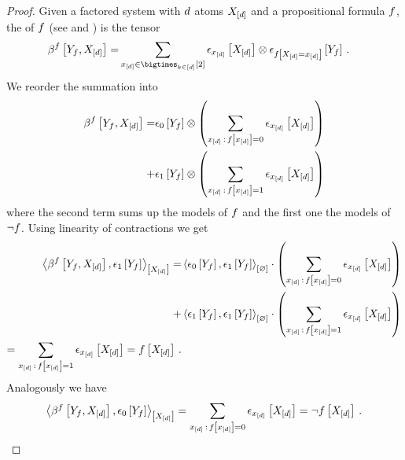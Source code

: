 \begin{proof}
    Given a factored system with $d$ atoms $X_{[d]}$ and a propositional formula $f$, the \basisEncoding{} of $f$ (see  and ) is the tensor
    \begin{align*}
        \bencodingofat{\formula}{\formulavar,\shortcatvariables}
        = & \sum_{\shortcatindices\in\atomstates}  \onehotmapofat{\shortcatindices}{\shortcatvariables} \otimes \onehotmapofat{\formulaat{\indexedshortcatvariables}}{\formulavar} \, .
    \end{align*}
    We reorder the summation into
    \begin{align*}
        \bencodingofat{\formula}{\formulavar,\shortcatvariables}
        = & \fbasisat{\formulavar} \otimes \left( \sum_{\formulazerocoordinates}  \onehotmapofat{\shortcatindices}{\shortcatvariables} \right) \\
        + & \tbasisat{\formulavar} \otimes \left( \sum_{\formulaonecoordinates}  \onehotmapofat{\shortcatindices}{\shortcatvariables} \right)
    \end{align*}
    where the second term sums up the models of $f$ and the first one the models of $\lnot f$.
    Using linearity of contractions we get
    \begin{align*}
        \contractionof{\bencodingofat{\formula}{\formulavar,\shortcatvariables},\tbasisat{\formulavar}}{\shortcatvariables}
        = & \contraction{\fbasisat{\formulavar},\tbasisat{\formulavar}} \cdot \left( \sum_{\formulazerocoordinates}  \onehotmapofat{\shortcatindices}{\shortcatvariables} \right) \\
        + & \contraction{\tbasisat{\formulavar},\tbasisat{\formulavar}} \cdot \left( \sum_{\formulaonecoordinates}  \onehotmapofat{\shortcatindices}{\shortcatvariables} \right) \\
        = \sum_{\formulaonecoordinates}  \onehotmapofat{\shortcatindices}{\shortcatvariables} = \formulaat{\shortcatvariables} \, .
    \end{align*}
    Analogously we have
    \begin{align*}
        \contractionof{\bencodingofat{\formula}{\formulavar,\shortcatvariables},\fbasisat{\formulavar}}{\shortcatvariables}
        = \sum_{\formulazerocoordinates}  \onehotmapofat{\shortcatindices}{\shortcatvariables} = \lnot\formulaat{\shortcatvariables} \, . \qedhere
    \end{align*}
\end{proof}


